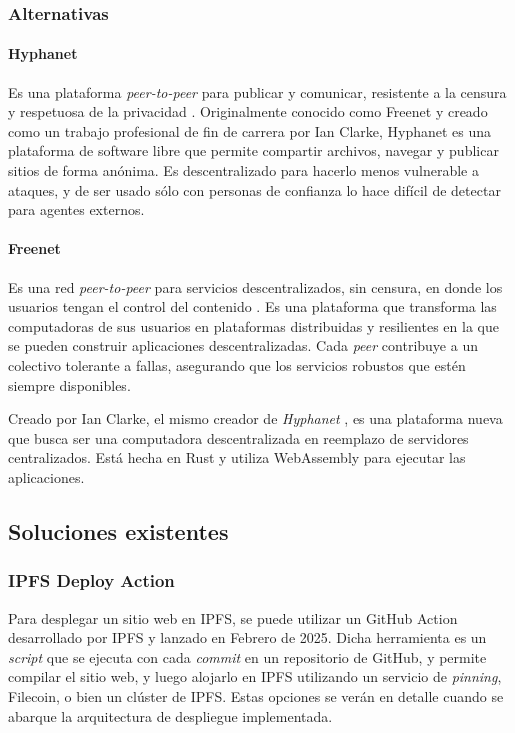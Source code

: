 \subsubsection{Alternativas}
\paragraph{Hyphanet} Es una plataforma  \textit{peer-to-peer} para publicar y comunicar, resistente a la censura y respetuosa de la privacidad \cite{hyphanet-white-paper} \cite{hyphanet}. Originalmente conocido como Freenet y creado como un trabajo profesional de fin de carrera por Ian Clarke, Hyphanet es una plataforma de software libre que permite compartir archivos, navegar y publicar sitios de forma anónima. Es descentralizado para hacerlo menos vulnerable a ataques, y de ser usado sólo con personas de confianza lo hace difícil de detectar para agentes externos.

\paragraph{Freenet} Es una red  \textit{peer-to-peer} para servicios descentralizados, sin censura, en donde los usuarios tengan el control del contenido \cite{freenet}. Es una plataforma que transforma las computadoras de sus usuarios en plataformas distribuidas y resilientes en la que se pueden construir aplicaciones descentralizadas. Cada  \textit{peer} contribuye a un colectivo tolerante a fallas, asegurando que los servicios robustos que estén siempre disponibles.

Creado por Ian Clarke, el mismo creador de \textit{Hyphanet} \cite{hyphanet}, es una plataforma nueva que busca ser una computadora descentralizada en reemplazo de servidores centralizados. Está hecha en Rust y utiliza WebAssembly para ejecutar las aplicaciones.


\subsection{Soluciones existentes}

\subsubsection{IPFS Deploy Action}
Para desplegar un sitio web en IPFS, se puede utilizar un GitHub Action \cite{ipfs-deploy-action} desarrollado por IPFS y lanzado en Febrero de 2025. Dicha herramienta es un \textit{script} que se ejecuta con cada \textit{commit} en un repositorio de GitHub, y permite compilar el sitio web, y luego alojarlo en IPFS utilizando un servicio de \textit{pinning}, Filecoin, o bien un clúster de IPFS. Estas opciones se verán en detalle cuando se abarque la arquitectura de despliegue implementada.

